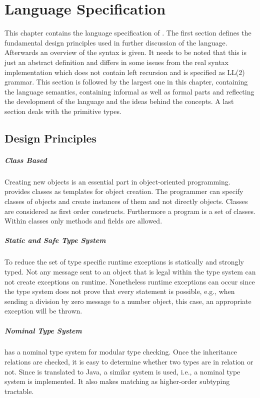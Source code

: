 \chapter{Language Specification}
\label{ctr:languageSpecification}
This chapter contains the language specification of \ooplss.  The first
section defines the fundamental design principles used in further
discussion of the language. Afterwards an overview of the syntax is
given. It needs to be noted that this is just an abstract definition and
differs in some issues from the real syntax implementation which does not
contain left recursion and is specified as LL(2) grammar. This section
is followed by the largest one in this chapter, containing the language
semantics, containing informal as well as formal parts and reflecting
the development of the language and the ideas behind the concepts. A
last section deals with the primitive types.

\section{Design Principles}
\paragraph{Class Based}
Creating new objects is an essential part in object-oriented
programming. \ooplss provides classes as templates for object
creation. The programmer can specify classes of objects and create
instances of them and not directly objects. Classes are considered as
first order constructs. Furthermore a program is a set of classes. Within
classes only methods and fields are allowed.

\paragraph{Static and Safe Type System}
To reduce the set of type specific runtime exceptions \ooplss is statically
and strongly typed. Not any message sent to an object that is legal within
the type system can not create exceptions on runtime. Nonetheless runtime
exceptions can occur since the type system does not prove that every
statement is possible, e.g., when sending a division by zero message to a
number object, this case, an appropriate exception will be thrown.

\paragraph{Nominal Type System}
\ooplss has a nominal type system for modular type checking. Once the
inheritance relations are checked, it is easy to determine whether
two types are in relation or not. Since \ooplss is translated to Java,
a similar system is used, i.e., a nominal type system is implemented.
It also makes matching as higher-order subtyping tractable.


